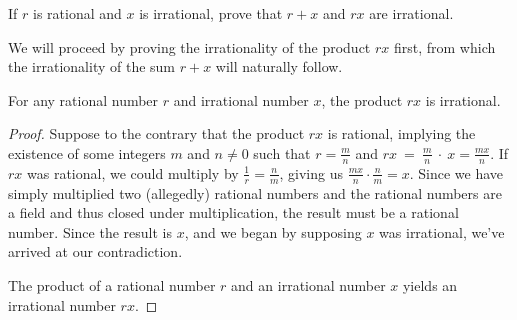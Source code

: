 \begin{exercise}
	If $r$ is rational and $x$ is irrational, prove that $r + x$ and $rx$ are irrational.
\end{exercise}

We will proceed by proving the irrationality of the product $rx$ first, from which the irrationality of the sum $r + x$ will naturally follow.

\begin{proposition}
	\label{proposition-1.1.1}
	For any rational number $r$ and irrational number $x$, the product $rx$ is irrational.
\end{proposition}
\begin{proof}
	Suppose to the contrary that the product $rx$ is rational, implying the existence of some integers $m$ and $n \neq 0$ such that $r = \frac{m}{n}$ and $rx~=~\frac{m}{n}~\cdot~x = \frac{mx}{n}$. If $rx$ was rational, we could multiply by $\frac{1}{r} = \frac{n}{m}$, giving us $\frac{mx}{n} \cdot \frac{n}{m} = x$. Since we have simply multiplied two (allegedly) rational numbers and the rational numbers are a field and thus closed under multiplication, the result must be a rational number. Since the result is $x$, and we began by supposing $x$ was irrational, we've arrived at our contradiction.
	
	The product of a rational number $r$ and an irrational number $x$ yields an irrational number $rx$. 
\end{proof}


